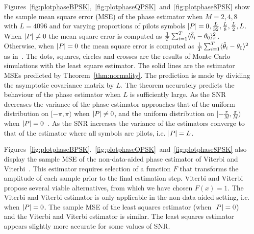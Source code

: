 \documentclass[journal]{IEEEtran}
\begin{document}
Figures~\ref{fig:plotphaseBPSK},~\ref{fig:plotphaseQPSK}~and~\ref{fig:plotphase8PSK} show the sample mean square error (MSE) of the phase estimator when $M=2,4,8$ with $L=4096$ and for varying proportions of pilots symbols ${\left\vert P \right\vert} = 0, \tfrac{L}{32}, \tfrac{L}{8}, \tfrac{L}{2}, L$.  When ${\left\vert P \right\vert} \neq 0$ the mean square error is computed as $\tfrac{1}{T}\sum_{i=1}^T\langle \hat{\theta}_i - \theta_0 \rangle_\pi^2$.  Otherwise, when ${\left\vert P \right\vert}=0$ the mean square error is computed as $\tfrac{1}{T}\sum_{i=1}^T\langle \hat{\theta}_i - \theta_0 \rangle^2$ as in~\cite{McKilliam_leastsqPSKnoncoICASSP_2012}.  The dots, squares, circles and crosses are the results of Monte-Carlo simulations with the least square estimator.  The solid lines are the estimator MSEs predicted by Theorem~\ref{thm:normality}.   %
The prediction is made by dividing the asymptotic covariance matrix by $L$.  The theorem accurately predicts the behaviour of the phase estimator when $L$ is sufficiently large.  As the SNR decreases the variance of the phase estimator approaches that of the uniform distribution on $[-\pi, \pi)$ when ${\left\vert P \right\vert} \neq 0$, and the uniform distribution on $[-\tfrac{\pi}{M}, \tfrac{\pi}{M})$ when ${\left\vert P \right\vert}=0$~\cite{McKilliam_leastsqPSKnoncoICASSP_2012}.  As the SNR increases the variance of the estimators converge to that of the estimator where all symbols are pilots, i.e. ${\left\vert P \right\vert} = L$.


Figures~\ref{fig:plotphaseBPSK},~\ref{fig:plotphaseQPSK}~and~\ref{fig:plotphase8PSK} also display the sample MSE of the non-data-aided phase estimator of Viterbi and Viterbi~\cite{ViterbiViterbi_phase_est_1983}.  This estimator requires selection of a function $F$ that transforms the amplitude of each sample prior to the final estimation step.  %
Viterbi and Viterbi propose several viable alternatives, from which we have chosen $F(x) = 1$.  The Viterbi and Viterbi estimator is only applicable in the non-data-aided setting, i.e. when ${\left\vert P \right\vert} = 0$.  The sample MSE of the least squares estimator (when ${\left\vert P \right\vert} = 0$) and the Viterbi and Viterbi estimator is similar.  The least squares estimator appears slightly more accurate for some values of SNR.
\end{document}
